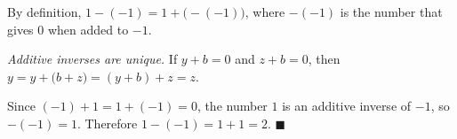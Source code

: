 By definition, $1-(-1)=1+\bigl(-(-1)\bigr)$, where $-(-1)$ is the number that gives $0$ when added to $-1$.

\emph{Additive inverses are unique.} If $y+b=0$ and $z+b=0$, then $y=y+\bigl(b+z\bigr)=(y+b)+z=z$.

Since $(-1)+1=1+(-1)=0$, the number $1$ is an additive inverse of $-1$, so $-(-1)=1$. Therefore $1-(-1)=1+1=2$. $\blacksquare$
